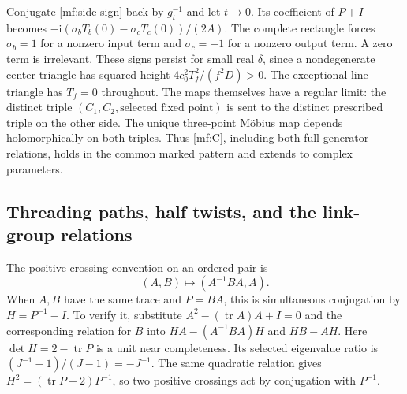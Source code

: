 \documentclass[11pt]{article}
\numberwithin{equation}{section}
\theoremstyle{definition}
\theoremstyle{remark}
\newcommand{\ii}{\mathrm i}
\begin{document}
Conjugate \eqref{mf:side-sign} back by \(g_t^{-1}\) and let \(t\to0\).
Its coefficient of \(P+I\) becomes
\(-\ii(\sigma_bT_b(0)-\sigma_cT_c(0))/(2A)\).
The complete rectangle forces \(\sigma_b=1\) for a nonzero input
term and \(\sigma_c=-1\) for a nonzero output term. A zero term is
irrelevant. These signs persist for small real \(\delta\), since a
nondegenerate center triangle has squared height
\(4c_0^2T_f^2/(f^2D)>0\). The exceptional line triangle has \(T_f=0\)
throughout.
The maps themselves have a regular limit: the distinct triple
\((C_1,C_2,\text{selected fixed point})\) is sent to the distinct
prescribed triple on the other side. The unique three-point Möbius
map depends holomorphically on both triples. Thus \eqref{mf:C},
including both full generator relations, holds in the common marked
pattern and extends to complex parameters.

\subsection{Threading paths, half twists, and the link-group relations}

The positive crossing convention on an ordered pair is
\begin{equation}\label{mf:hurwitz}
                    (A,B)\longmapsto(A^{-1}BA,A).
\end{equation}
When \(A,B\) have the same trace and \(P=BA\), this is simultaneous
conjugation by \(H=P^{-1}-I\). To verify it, substitute
\(A^2-(\operatorname{tr}A)A+I=0\) and the corresponding relation
for \(B\) into \(HA-(A^{-1}BA)H\) and \(HB-AH\).
Here \(\det H=2-\operatorname{tr}P\) is a unit near completeness.
Its selected eigenvalue ratio is
\((J^{-1}-1)/(J-1)=-J^{-1}\).
The same quadratic relation gives
\(H^2=(\operatorname{tr}P-2)P^{-1}\), so two positive crossings
act by conjugation with \(P^{-1}\).
\end{document}
